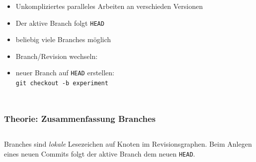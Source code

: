 \documentclass{beamer}
\begin{document}
\begin{frame}[fragile,label=branches10]
\begin{columns}
{\begin{tikzpicture}
    \end{tikzpicture}
} %
\begin{itemize}
\item Unkompliziertes paralleles Arbeiten an verschieden Versionen
\item<2-> Der aktive Branch folgt \texttt{HEAD}
\item<3-> beliebig viele Branches möglich
\item<4-> Branch/Revision wechseln:\\

\item<8-> neuer Branch auf \texttt{HEAD} erstellen:\\
\verb|git checkout -b experiment|
\end{itemize}
\end{columns}
\end{frame}


\begin{frame}[fragile,label=branches20]
\frametitle{Theorie: Zusammenfassung Branches}
\begin{columns}

  \begin{center}
    \Large Branches sind \emph{lokale} Lesezeichen auf Knoten im
    Revisionsgraphen. Beim Anlegen eines neuen Commits folgt der aktive
    Branch dem neuen \texttt{HEAD}.
  \end{center}
\end{columns}
\end{frame}
\end{document}
